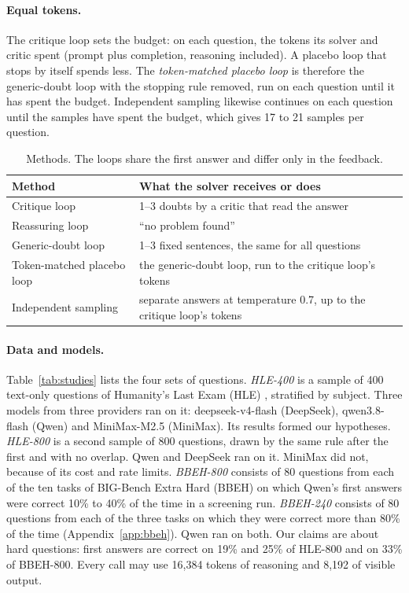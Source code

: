 \documentclass[11pt]{article}
\newcommand{\ds}{DeepSeek}
\newcommand{\qw}{Qwen}
\newcommand{\mm}{MiniMax}
\begin{document}
\paragraph{Equal tokens.}
The critique loop sets the budget: on each question, the tokens its solver and critic spent (prompt plus completion, reasoning included).
A placebo loop that stops by itself spends less. The \emph{token-matched placebo loop} is therefore the generic-doubt loop with the stopping rule removed, run on each question until it has spent the budget.
Independent sampling likewise continues on each question until the samples have spent the budget, which gives 17 to 21 samples per question.

\begin{table}[t]
\centering
\small
\setlength{\tabcolsep}{3pt}
\begin{tabular}{@{}p{2.55cm}p{4.6cm}@{}}
\toprule
Method & What the solver receives or does \\
\midrule
Critique loop & 1--3 doubts by a critic that read the answer \\
Reassuring loop & ``no problem found'' \\
Generic-doubt loop & 1--3 fixed sentences, the same for all questions \\
Token-matched placebo loop & the generic-doubt loop, run to the critique loop's tokens \\
Independent sampling & separate answers at temperature 0.7, up to the critique loop's tokens \\
\bottomrule
\end{tabular}
\caption{Methods. The loops share the first answer and differ only in the feedback.}
\label{tab:conditions}
\end{table}

\paragraph{Data and models.}
Table~\ref{tab:studies} lists the four sets of questions.
\emph{HLE-400} is a sample of 400 text-only questions of Humanity's Last Exam (HLE) \citep{phan2025hle}, stratified by subject. Three models from three providers ran on it: deepseek-v4-flash (\ds), qwen3.8-flash (\qw) and MiniMax-M2.5 (\mm). Its results formed our hypotheses.
\emph{HLE-800} is a second sample of 800 questions, drawn by the same rule after the first and with no overlap. \qw{} and \ds{} ran on it. \mm{} did not, because of its cost and rate limits.
\emph{BBEH-800} consists of 80 questions from each of the ten tasks of BIG-Bench Extra Hard (BBEH) \citep{kazemi2025bbeh} on which \qw's first answers were correct 10\% to 40\% of the time in a screening run. \emph{BBEH-240} consists of 80 questions from each of the three tasks on which they were correct more than 80\% of the time (Appendix~\ref{app:bbeh}). \qw{} ran on both.
Our claims are about hard questions: first answers are correct on 19\% and 25\% of HLE-800 and on 33\% of BBEH-800.
Every call may use 16{,}384 tokens of reasoning and 8{,}192 of visible output.
\end{document}
